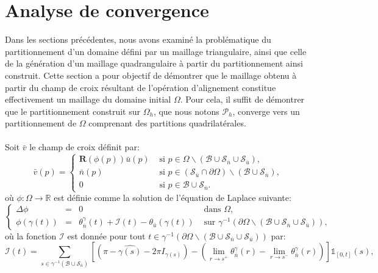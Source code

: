 \section{Analyse de convergence}
\label{subsec:analyse_convergence}

Dans les sections précédentes, nous avons examiné la problématique du partitionnement d'un domaine défini par un maillage triangulaire, ainsi que celle de la génération d'un maillage quadrangulaire à partir du partitionnement ainsi construit. Cette section a pour objectif de démontrer que le maillage obtenu à partir du champ de croix résultant de l'opération d'alignement constitue effectivement un maillage du domaine initial $\Omega$. Pour cela, il suffit de démontrer que le partitionnement construit sur $\Omega_h$, que nous notons $\mathcal{P}_h$, converge vers un partitionnement de $\Omega$ comprenant des partitions quadrilatérales.\\\\
Soit $\bar{v}$ le champ de croix définit par:
\begin{equation}
\bar{v}(p)=
\left\{
\begin{array}{ll}
\mathbf{R}(\phi(p))\bar{u}(p) & \mbox{ si } p\in\Omega\backslash(\mathcal{B}\cup\mathcal{S}_{\bar{n}}\cup\mathcal{S}_{\bar{u}}),\\[0.5cm]
\bar{n}(p) & \mbox{ si } p\in(\mathcal{S}_{\bar{u}}\cap\partial\Omega)\backslash(\mathcal{B}\cup\mathcal{S}_{\bar{n}}),\\[0.5cm]
0 & \mbox{ si } p\in\mathcal{B}\cup\mathcal{S}_{\bar{n}}.
\end{array}
\right.
\label{eqn:continuous_def_v}
\end{equation}
où $\phi:\Omega\longrightarrow\mathbb{R}$ est définie comme la solution de l'équation de Laplace suivante:
\begin{equation}
\left\{
\begin{array}{lcll}
\Delta\phi &=& 0 &\mbox{ dans }\Omega,\\[0.5cm]
\phi(\gamma(t))&=&\theta_{\bar{n}}^\gamma(t)+\mathcal{I}(t)-\theta_{\bar{u}}(\gamma(t))& \mbox{ sur } \gamma^{-1}(\partial\Omega\backslash(\mathcal{B}\cup\mathcal{S}_{\bar{n}}\cup\mathcal{S}_{\bar{u}})),
\end{array}
\right.
\label{eqn:continuous_def_phi}
\end{equation}
où la fonction $\mathcal{I}$ est donnée pour tout $t\in\gamma^{-1}(\partial\Omega\backslash(\mathcal{B}\cup\mathcal{S}_{\bar{n}}\cup\mathcal{S}_{\bar{u}}))$ par:
$$
\mathcal{I}(t)=\sum_{s\in\gamma^{-1}(\mathcal{B}\cup\mathcal{S}_{\bar{n}})}\left[\left(\pi-\widehat{\gamma(s)}-2\pi I_{\gamma(s)}\right)-\left(\lim\limits_{r\rightarrow s^+}\theta^{\gamma}_{\bar{n}}(r) - \lim\limits_{r\rightarrow s^-}\theta^{\gamma}_{\bar{n}}(r)\right)\right]\mathbb{1}_{[0, t]}(s),
$$
